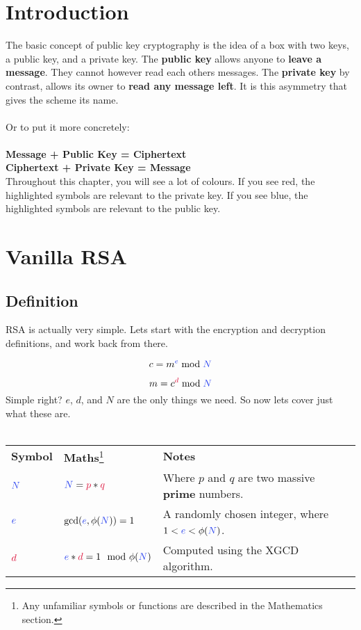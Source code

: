 
\section{Introduction}

	The basic concept of public key cryptography is the idea of a box with two keys, a public key, and a private key. The \textbf{public key} allows anyone to \textbf{leave a message}. They cannot however read each others messages. The \textbf{private key} by contrast, allows its owner to \textbf{read any message left}. It is this asymmetry that gives the scheme its name.\\
	\\
	Or to put	it more concretely:\\
	\\
	\textbf{Message + \textcolor{B}{Public Key} = Ciphertext}\\
	\textbf{Ciphertext + \textcolor{R}{Private Key} = Message}\\

	Throughout this chapter, you will see a lot of colours. If you see \textcolor{R}{red}, the highlighted symbols are relevant to the \textcolor{R}{private key}. If you see \textcolor{B}{blue}, the highlighted symbols are relevant to the \textcolor{B}{public key}.

\section{Vanilla RSA}

	\subsection{Definition}

		RSA is actually very simple. Lets start with the encryption and decryption definitions, and work back from there.

		$$ c = m^{\textcolor{B}{e}} \bmod \textcolor{B}{N} $$

		$$ m = c^{\textcolor{R}{d}} \bmod \textcolor{B}{N} $$
		Simple right? $e$, $d$, and $N$ are the only things we need. So now lets cover just what these are.\\
		\\
	  \begin{tabularx}{\linewidth}{l l X}
	  \textbf{Symbol} & \textbf{Maths}\footnote{Any unfamiliar symbols or functions are described in the Mathematics section.} & \textbf{Notes}\\
	  $\textcolor{B}{N}$ & $\textcolor{B}{N} = \textcolor{R}{p} * \textcolor{R}{q}$ & Where $p$ and $q$ are two massive \textbf{prime} numbers.
	  \\
	  $\textcolor{B}{e}$ & $\gcd(\textcolor{B}{e},\phi(\textcolor{B}{N}))=1$ & A randomly chosen integer, where $1 < \textcolor{B}{e} < \phi(\textcolor{B}{N})$.
	  \\
	  $\textcolor{R}{d}$ & $\textcolor{B}{e}*\textcolor{R}{d} = 1 \mod \phi(\textcolor{B}{N})$ & Computed using the XGCD algorithm.
	  \\
	  \end{tabularx}
	  

